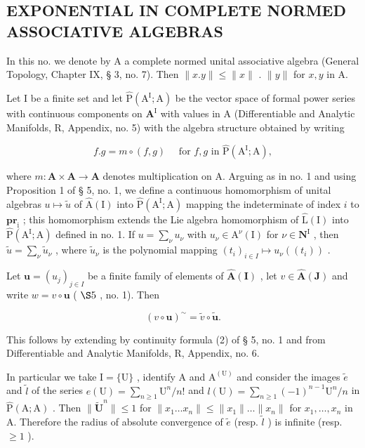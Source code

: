 \subsection{EXPONENTIAL IN COMPLETE NORMED ASSOCIATIVE ALGEBRAS}

In this no. we denote by A a complete normed unital associative algebra (General Topology, Chapter IX, § 3, no. 7). Then \(\| x.y\| \leqslant \| x\|\) . \(\| y\|\) for \(x,y\) in A.

Let I be a finite set and let \(\hat{\mathrm{P}} (\mathrm{A}^{\mathrm{I}};\mathrm{A})\) be the vector space of formal power series with continuous components on \(\mathbf{A}^{\mathrm{I}}\) with values in A (Differentiable and Analytic Manifolds, R, Appendix, no. 5) with the algebra structure obtained by writing

\[
f. g = m \circ (f, g) \quad \text { for } f, g \text { in } \hat {\mathrm{P}} (\mathrm{A} ^ {\mathrm{I}}; \mathrm{A}),
\]

where \(m: \mathbf{A} \times \mathbf{A} \to \mathbf{A}\) denotes multiplication on A. Arguing as in no. 1 and using Proposition 1 of § 5, no. 1, we define a continuous homomorphism of unital algebras \(u \mapsto \tilde{u}\) of \(\hat{\mathrm{A}}(\mathrm{I})\) into \(\hat{\mathrm{P}}(\mathrm{A}^{\mathrm{I}}; \mathrm{A})\) mapping the indeterminate of index \(i\) to \(\mathbf{pr}_{\mathrm{i}}\) ; this homomorphism extends the Lie algebra homomorphism of \(\hat{\mathrm{L}}(\mathrm{I})\) into \(\hat{\mathrm{P}}(\mathrm{A}^{\mathrm{I}}; \mathrm{A})\) defined in no. 1. If \(u = \sum_{\nu} u_{\nu}\) with \(u_{\nu} \in \mathrm{A}^{\nu}(\mathrm{I})\) for \(\nu \in \mathbf{N}^{\mathrm{I}}\) , then \(\tilde{u} = \sum_{\nu} \tilde{u}_{\nu}\) , where \(\tilde{u}_{\nu}\) is the polynomial mapping \((t_{i})_{i \in I} \mapsto u_{\nu}((t_{i}))\) .

Let \(\boldsymbol{u} = (u_{j})_{j \in I}\) be a finite family of elements of \(\hat{\mathbf{A}}(\mathbf{I})\) , let \(v \in \hat{\mathbf{A}}(\mathbf{J})\) and write \(w = v \circ \boldsymbol{u}\) ( \(\S 5\) , no. 1). Then

\[
(v \circ \boldsymbol {u}) ^ {\sim} = \tilde {v} \circ \tilde {\boldsymbol {u}}.\tag{18}
\]

This follows by extending by continuity formula (2) of § 5, no. 1 and from Differentiable and Analytic Manifolds, R, Appendix, no. 6.

In particular we take \(\mathrm{I} = \{\mathrm{U}\}\) , identify A and \(\mathrm{A}^{(\mathrm{U})}\) and consider the images \(\tilde{e}\) and \(\tilde{l}\) of the series \(e(\mathrm{U}) = \sum_{n\geqslant 1}\mathrm{U}^n /n!\) and \(l(\mathrm{U}) = \sum_{n\geqslant 1}(-1)^{n - 1}\mathrm{U}^n /n\) in \(\hat{\mathrm{P}} (\mathrm{A};\mathrm{A})\) . Then \(\| \tilde{\mathbf{U}}^n\| \leqslant 1\) for \(\| x_1\dots x_n\| \leqslant \| x_1\| \dots \| x_n\|\) for \(x_{1},\ldots ,x_{n}\) in A. Therefore the radius of absolute convergence of \(\tilde{e}\) (resp. \(\tilde{l}\) ) is infinite (resp. \(\geqslant 1\) ).

